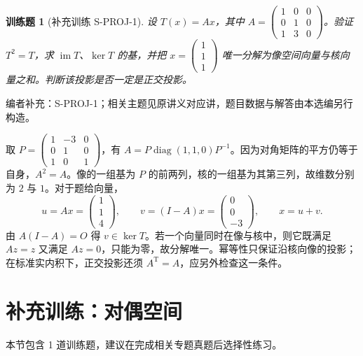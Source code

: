 \documentclass[UTF8,12pt,a4paper,fontset=fandol]{ctexart}
\newtheorem{exercise}{训练题}[section]
\begin{document}
\begin{exercise}[补充训练 S-PROJ-1]\label{prob:S-PROJ-1}
设 $T(x)=Ax$，其中 $A=\begin{pmatrix}1&0&0\\0&1&0\\1&3&0\end{pmatrix}$。验证 $T^2=T$，求 $\operatorname{im} T$、$\ker T$ 的基，并把 $x=\begin{pmatrix}1\\1\\1\end{pmatrix}$ 唯一分解为像空间向量与核向量之和。判断该投影是否一定是正交投影。
\end{exercise}
\noindent 编者补充：S-PROJ-1；相关主题见原讲义对应讲，题目数据与解答由本选编另行构造。
\begin{solve}
取 $P=\begin{pmatrix}1&-3&0\\0&1&0\\1&0&1\end{pmatrix}$，有 $A=P\operatorname{diag}(1,1,0)P^{-1}$。因为对角矩阵的平方仍等于自身，$A^2=A$。像的一组基为 $P$ 的前两列，核的一组基为其第三列，故维数分别为 $2$ 与 $1$。对于题给向量，
\[u=Ax=\begin{pmatrix}1\\1\\4\end{pmatrix},\qquad v=(I-A)x=\begin{pmatrix}0\\0\\-3\end{pmatrix},\qquad x=u+v.\]
由 $A(I-A)=O$ 得 $v\in\ker T$。若一个向量同时在像与核中，则它既满足 $Az=z$ 又满足 $Az=0$，只能为零，故分解唯一。幂等性只保证沿核向像的投影；在标准实内积下，正交投影还须 $A^{\mathrm T}=A$，应另外检查这一条件。
\end{solve}

\section{补充训练：对偶空间}

本节包含 1 道训练题，建议在完成相关专题真题后选择性练习。
\end{document}
